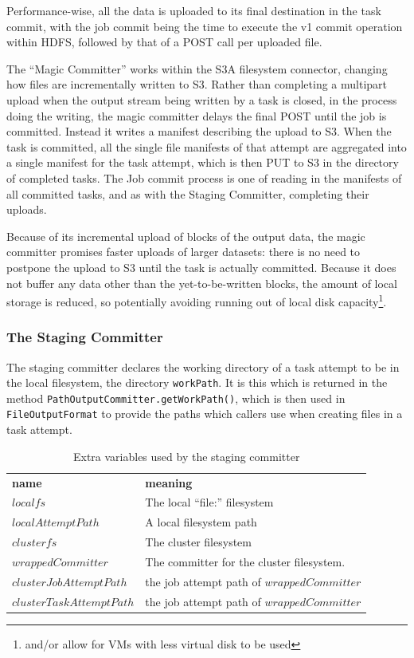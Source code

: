 \documentclass[conference]{IEEEtran}
\begin{document}
Performance-wise, all the data is uploaded to its final destination in the task commit, with the
job commit being the time to execute the v1 commit operation within HDFS, followed
by that of a POST call per uploaded file.


The ``Magic Committer'' works within the S3A filesystem connector, changing
how files are incrementally written to S3.
Rather than completing a multipart upload when the output stream being written
by a task is closed, in the process doing the writing, the magic
committer delays the final POST until the job is committed.
Instead it writes a manifest describing the upload to S3.
When the task is committed, all the single file manifests of that attempt
are aggregated into a single manifest for the task attempt, which is then
PUT to S3 in the directory of completed tasks.
The Job commit process is one of reading in the manifests of all committed
tasks, and as with the Staging Committer, completing their uploads.

Because of its incremental upload of blocks of the output data, the magic committer promises
faster uploads of larger datasets: there is no need to postpone the upload
to S3 until the task is actually committed.
Because it does not buffer any data other than the yet-to-be-written blocks,
the amount of local storage is reduced, so potentially avoiding running
out of local disk capacity\footnote{and/or allow for VMs with less virtual disk to be used}.


\subsubsection{The Staging Committer}

The staging committer declares the working directory of a task
attempt to be in the local filesystem, the directory \texttt{workPath}.
It is this which is returned in the method \texttt{PathOutputCommitter.getWorkPath()},
which is then used in \texttt{FileOutputFormat} to provide the paths which
callers use when creating files in a task attempt.



\begin{table}
  \caption{Extra variables used by the staging committer}
  \begin{tabular}{ l l }
    \hline
    \textbf{name} & \textbf{meaning} \\
    $localfs$ & The local ``file:'' filesystem \\
    $localAttemptPath$ & A local filesystem path \\
    $clusterfs$ & The cluster filesystem \\
    $wrappedCommitter$ & The committer for the cluster filesystem. \\
    $clusterJobAttemptPath$ & the job attempt path of $wrappedCommitter$ \\
    $clusterTaskAttemptPath$ & the job attempt path of $wrappedCommitter$ \\
    \hline
  \end{tabular}
  \label{tab:StagingCommitter.variables}
\end{table}
\end{document}
